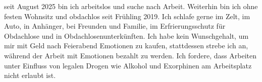 		seit August 2025 bin ich arbeitslos und suche nach Arbeit.
		Weiterhin bin ich ohne festen Wohnsitz und obdachlos seit Frühling 2019.
		Ich schlafe gerne im Zelt, im Auto, in Anhänger, bei Freunden und Familie, im Erfrierungsschutz für Obdachlose und in Obdachlosenunterkünften.
		Ich habe kein Wunschgehalt, um mir mit Geld nach Feierabend Emotionen zu kaufen, stattdessen strebe ich an, während der Arbeit mit Emotionen bezahlt zu werden.
		Ich fordere, dass Arbeiten unter Einfluss von legalen Drogen wie Alkohol und Exorphinen am Arbeitsplatz nicht erlaubt ist.